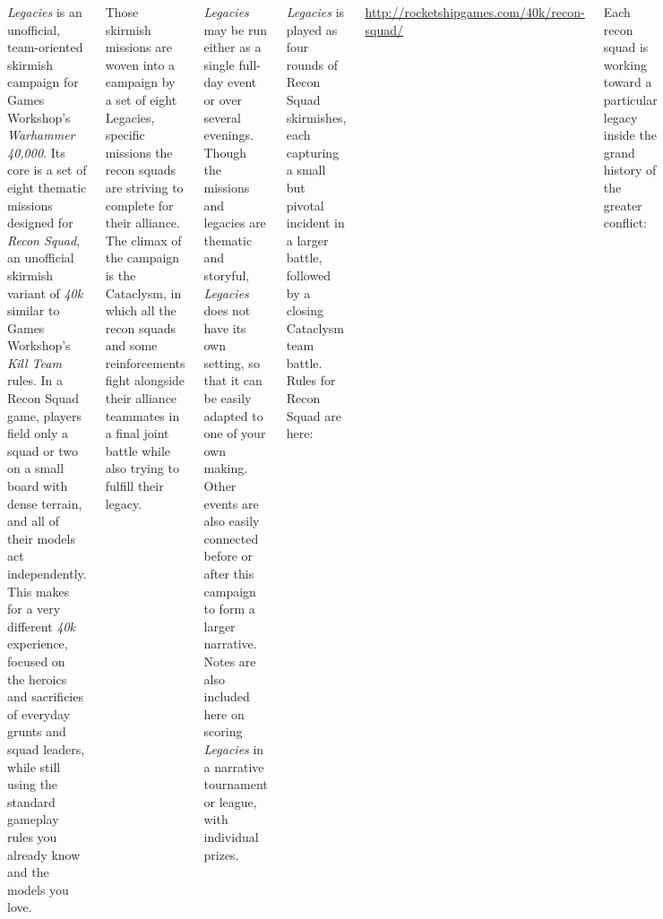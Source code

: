 \clearpage
{}

\begin{columns}

  \emph{Legacies} is an unofficial, team-oriented skirmish campaign
  for Games Workshop's \emph{Warhammer 40,000}.  Its core is a set of
  eight thematic missions designed for \emph{Recon Squad}, an
  unofficial skirmish variant of \emph{40k} similar to Games
  Workshop's \emph{Kill Team} rules.  In a Recon Squad game, players
  field only a squad or two on a small board with dense terrain, and
  all of their models act independently.  This makes for a very
  different \emph{40k} experience, focused on the heroics and
  sacrificies of everyday grunts and squad leaders, while still using
  the standard gameplay rules you already know and the models you
  love.

  Those skirmish missions are woven into a campaign by a set of eight
  Legacies, specific missions the recon squads are striving to
  complete for their alliance.  The climax of the campaign is the
  Cataclysm, in which all the recon squads and some reinforcements
  fight alongside their alliance teammates in a final joint battle
  while also trying to fulfill their legacy.

  \emph{Legacies} may be run either as a single full-day event or over
  several evenings.  Though the missions and legacies are thematic and
  storyful, \emph{Legacies} does not have its own setting, so that it
  can be easily adapted to one of your own making.  Other events are
  also easily connected before or after this campaign to form a larger
  narrative.  Notes are also included here on scoring \emph{Legacies}
  in a narrative tournament or league, with individual prizes.


\emph{Legacies} is played as four rounds of Recon Squad skirmishes,
each capturing a small but pivotal incident in a larger battle,
followed by a closing Cataclysm team battle.  Rules for Recon Squad
are here:

\bigskip%
\centerline{\url{http://rocketshipgames.com/40k/recon-squad/}}

\bigskip%
Each recon squad is working toward a particular legacy inside the
grand history of the greater conflict:

\begin{squishitemize}
\item \textbf{Bodyguards:} Fierce defenders of critical battlefield
  leaders and personnel;


\end{squishitemize}
\end{columns}
